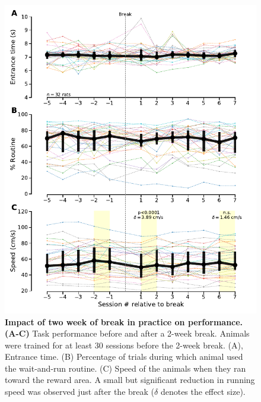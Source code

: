 \begin{figure}[bth!]
  \begin{center}
    \includegraphics[scale=1]{ch-appendicies/figures/BreakEffect.pdf}
    \caption[Impact of a Two-week Break]
    {\textbf{Impact of two week of break in practice on performance.}
    \textbf{(A-C)} Task performance before and after a 2-week break. Animals were trained for at least 30 sessions before the 2-week break. (A), Entrance time. (B) Percentage of trials during which animal used the wait-and-run routine. (C) Speed of the animals when they ran toward the reward area. A small but significant reduction in running speed was observed just after the break ($\delta$ denotes the effect size).
    }
    \label{fig:appendix:break}
  \end{center}
\end{figure}